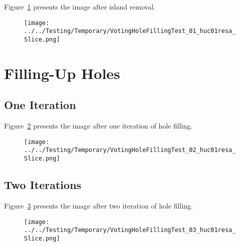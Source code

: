 \documentclass{InsightArticle}
\begin{document}
Figure~\ref{fig:IslandRemovalImage} presents the image after island removal.

\begin{figure}
\center
\texttt{[image: ../../Testing/Temporary/VotingHoleFillingTest\_01\_huc01resa\_Slice.png]}
\label{fig:IslandRemovalImage}
\end{figure}


\section{Filling-Up Holes}

\begin{center}

\end{center}


\subsection{One Iteration}

Figure~\ref{fig:HoleFillingIteration01Image} presents the image after one iteration of hole filling.

\begin{figure}
\center
\texttt{[image: ../../Testing/Temporary/VotingHoleFillingTest\_02\_huc01resa\_Slice.png]}
\label{fig:HoleFillingIteration01Image}
\end{figure}



\subsection{Two Iterations}

Figure~\ref{fig:HoleFillingIteration02Image} presents the image after two iteration of hole filling.

\begin{figure}
\center
\texttt{[image: ../../Testing/Temporary/VotingHoleFillingTest\_03\_huc01resa\_Slice.png]}
\label{fig:HoleFillingIteration02Image}
\end{figure}
\end{document}
